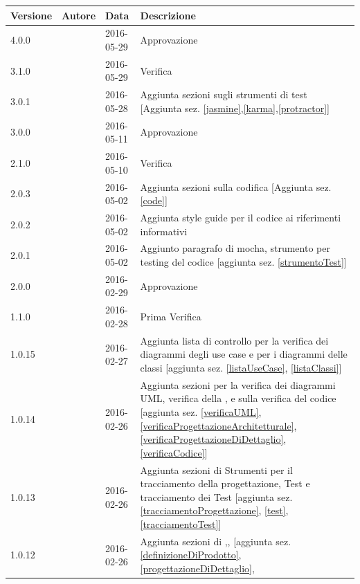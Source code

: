 \documentclass[12pt,a4paper]{article}
\begin{document}
\begin{center}
	\begin{longtable}[H]{p{} p{} p{} p{}}
		\toprule
		\textbf{Versione}	&	\textbf{Autore}	&	\textbf{Data}	&	\textbf{Descrizione}\\*
		\midrule
		\midrule
		4.0.0 & \AVI{} & 2016-05-29 & Approvazione\\*
		\midrule
		3.1.0 & \TP{} & 2016-05-29 & Verifica\\*
		\midrule
		3.0.1 & \AVE{} & 2016-05-28 & Aggiunta sezioni sugli strumenti di test [Aggiunta sez. \ref{jasmine},\ref{karma},\ref{protractor}]\\*
		\midrule
		3.0.0 & \AVE{} & 2016-05-11 & Approvazione\\*
		\midrule
		2.1.0 & \WS{} & 2016-05-10 & Verifica\\*
		\midrule
		2.0.3 & \IB{} & 2016-05-02 & Aggiunta sezioni sulla codifica [Aggiunta sez. \ref{code}]\\*
		\midrule
		2.0.2 & \IB{} & 2016-05-02 & Aggiunta style guide per il codice ai riferimenti informativi\\*
		\midrule
		2.0.1 & \IB{} & 2016-05-02 & Aggiunto paragrafo di mocha, strumento per testing del codice [aggiunta sez. \ref{strumentoTest}]\\*
		\midrule
		2.0.0 & \AB{} & 2016-02-29 & Approvazione\\*
		\midrule
		1.1.0 & \AVI{} & 2016-02-28 & Prima Verifica\\*
		\midrule
		1.0.15 & \TP{} & 2016-02-27 & Aggiunta lista di controllo per la verifica dei diagrammi degli use case e per i diagrammi delle classi [aggiunta sez. 
		\ref{listaUseCase},
		\ref{listaClassi}]\\*
		\midrule
		1.0.14 & \TP{} & 2016-02-26 & Aggiunta sezioni per la verifica dei diagrammi UML, verifica della \FPA{}, \FPD{} e sulla verifica del codice [aggiunta sez. 
		\ref{verificaUML},
		\ref{verificaProgettazioneArchitetturale},
		\ref{verificaProgettazioneDiDettaglio},
		\ref{verificaCodice}]\\*
		\midrule
		1.0.13 & \TP{} & 2016-02-26 & Aggiunta sezioni di Strumenti per il tracciamento della progettazione, Test e tracciamento dei Test [aggiunta sez. 
		\ref{tracciamentoProgettazione},
		\ref{test},
		\ref{tracciamentoTest}]\\*
		\midrule
		1.0.12 & \TP{} & 2016-02-26 & Aggiunta sezioni di \DP{},\FPD{},\FPA{} [aggiunta sez. \ref{definizioneDiProdotto},
		\ref{progettazioneDiDettaglio},

\end{longtable}
\end{center}
\end{document}

